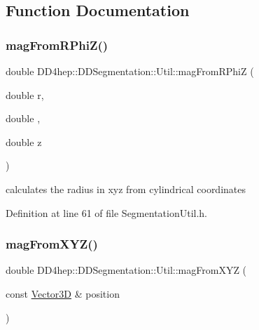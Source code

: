 \subsection{Function Documentation}
\hypertarget{namespace_d_d4hep_1_1_d_d_segmentation_1_1_util_aa316184b02cf82f628558fc2f543d973}{}\label{namespace_d_d4hep_1_1_d_d_segmentation_1_1_util_aa316184b02cf82f628558fc2f543d973} 
\subsubsection{\texorpdfstring{mag\+From\+R\+Phi\+Z()}{magFromRPhiZ()}}
{\footnotesize\ttfamily double D\+D4hep\+::\+D\+D\+Segmentation\+::\+Util\+::mag\+From\+R\+PhiZ (\begin{DoxyParamCaption}\item[{double}]{r,  }\item[{double}]{,  }\item[{double}]{z }\end{DoxyParamCaption})}



calculates the radius in xyz from cylindrical coordinates 



Definition at line 61 of file Segmentation\+Util.\+h.

\hypertarget{namespace_d_d4hep_1_1_d_d_segmentation_1_1_util_a696e414df89c2948f71d83861bb91f96}{}\label{namespace_d_d4hep_1_1_d_d_segmentation_1_1_util_a696e414df89c2948f71d83861bb91f96} 
\subsubsection{\texorpdfstring{mag\+From\+X\+Y\+Z()}{magFromXYZ()}}
{\footnotesize\ttfamily double D\+D4hep\+::\+D\+D\+Segmentation\+::\+Util\+::mag\+From\+X\+YZ (\begin{DoxyParamCaption}\item[{const \hyperlink{struct_d_d4hep_1_1_d_d_segmentation_1_1_vector3_d}{Vector3D} \&}]{position }\end{DoxyParamCaption})}



